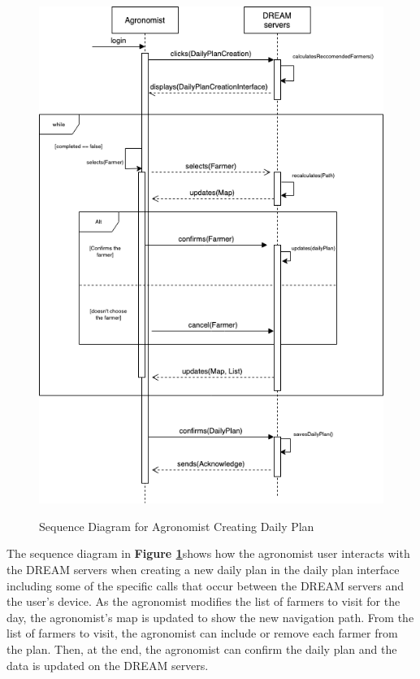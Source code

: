 \begin{figure}[hpt!]
\centering
\includegraphics[scale=0.5]{Files/sequence_disgrams/thePNGs/agronomist_createPlan.png}\\
\caption{\label{fig:agrSeqCreatePlan}Sequence Diagram for Agronomist Creating Daily Plan}
\end{figure}
\begin{flushleft}
The sequence diagram in \textbf{Figure \ref{fig:agrSeqCreatePlan}}shows how the agronomist user interacts with the DREAM servers when creating a new daily plan in the daily plan interface including some of the specific calls that occur between the DREAM servers and the user's device. As the agronomist modifies the list of farmers to visit for the day, the agronomist's map is updated to show the new navigation path. From the list of farmers to visit, the agronomist can include or remove each farmer from the plan. Then, at the end, the agronomist can confirm the daily plan and the data is updated on the DREAM servers.
\end{flushleft}

